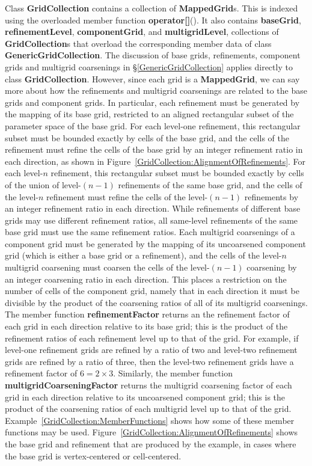 \documentclass{article}
\begin{document}
Class \textbf{GridCollection} contains a collection of \textbf{MappedGrid}s.  This is indexed using the overloaded member
function \textbf{operator[]}().  It also contains \textbf{baseGrid}, \textbf{refinementLevel},
\textbf{componentGrid}, and \textbf{multigridLevel}, collections of \textbf{GridCollection}s that overload the
corresponding member data of class \textbf{GenericGridCollection}.  The discussion of base grids, refinements, component grids and
multigrid coarsenings in \S\ref{GenericGridCollection} applies directly to class \textbf{GridCollection}.  However, since each grid
is a \textbf{MappedGrid}, we can say more about how the refinements and multigrid coarsenings are related to the base grids and
component grids.  In particular, each refinement must be generated by the mapping of its base grid, restricted to an aligned rectangular
subset of the parameter space of the base grid.  For each level-one refinement, this rectangular subset must be bounded exactly by cells of
the base grid, and the cells of the refinement must refine the cells of the base grid by an integer refinement ratio in each direction, as
shown in Figure~\ref{GridCollection:AlignmentOfRefinements}.  For each level-$n$ refinement, this rectangular subset must be bounded exactly
by cells of the union of level-$(n-1)$ refinements of the same base grid, and the cells of the level-$n$ refinement must refine the cells of
the level-$(n-1)$ refinements by an integer refinement ratio in each direction.  While refinements of different base grids may use different
refinement ratios, all same-level refinements of the same base grid must use the same refinement ratios.  Each multigrid coarsenings of a
component grid must be generated by the mapping of its uncoarsened component grid (which is either a base grid or a refinement), and the
cells of the level-$n$ multigrid coarsening must coarsen the cells of the level-$(n-1)$ coarsening by an integer coarsening ratio in each
direction.  This places a restriction on the number of cells of the component grid, namely that in each direction it must be divisible by
the product of the coarsening ratios of all of its multigrid coarsenings.  The member function \textbf{refinementFactor} returns an
the refinement factor of each grid in each direction relative to its base grid; this is the product of the refinement ratios of each
refinement level up to that of the grid.  For example, if level-one refinement grids are refined by a ratio of two and level-two refinement
grids are refined by a ratio of three, then the level-two refinement grids have a refinement factor of $6 = 2 \times 3$.  Similarly, the
member function \textbf{multigridCoarseningFactor} returns the multigrid coarsening factor of each grid in each direction relative
to its uncoarsened component grid; this is the product of the coarsening ratios of each multigrid level up to that of the grid.
Example~\ref{GridCollection:MemberFunctions} shows how some of these member functions may be used.
Figure~\ref{GridCollection:AlignmentOfRefinements} shows the base grid and refinement that are produced by the example, in cases where
the base grid is vertex-centered or cell-centered.
\end{document}
